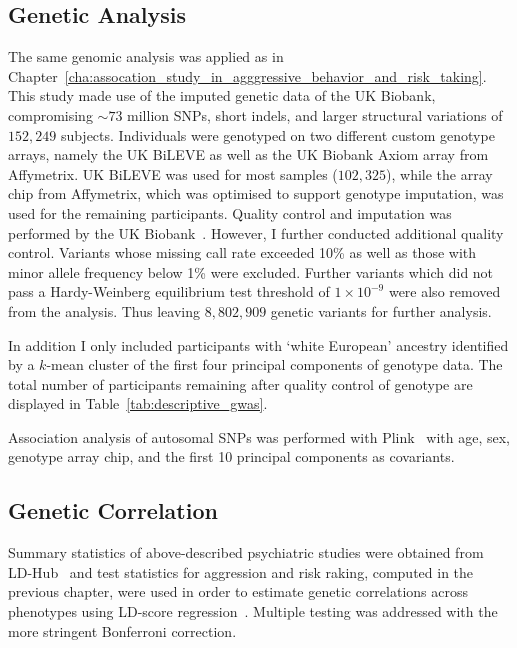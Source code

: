 \subsection{Genetic Analysis}
\label{sub:genetic_analysis}

The same genomic analysis was applied as in Chapter~\ref{cha:assocation_study_in_agggressive_behavior_and_risk_taking}.
This study made use of the imputed genetic data of the UK Biobank, compromising $\sim73$ million SNPs, short indels, and larger structural variations of $152,249$ subjects.
Individuals were genotyped on two different custom genotype arrays, namely the UK BiLEVE as well as the UK Biobank Axiom array from Affymetrix. 
UK BiLEVE was used for most samples ($102,325$), while the array chip from Affymetrix, which was optimised to support genotype imputation, was used for the remaining participants. 
Quality control and imputation was performed by the UK Biobank~\cite{Marchini2015}.
However, I further conducted additional quality control.
Variants whose missing call rate exceeded 10\% as well as those with minor allele frequency below 1\% were excluded.
Further variants which did not pass a Hardy-Weinberg equilibrium test threshold of $1\times10^{-9}$ were also removed from the analysis.
Thus leaving $8,802,909$ genetic variants for further analysis.

In addition I only included participants with `white European' ancestry identified by a $k$-mean cluster of the first four principal components of genotype data.
The total number of participants remaining after quality control of genotype are displayed in Table~\ref{tab:descriptive_gwas}.

Association analysis of autosomal SNPs was performed with Plink~\cite{Purcell2007,Chang2015} with age, sex, genotype array chip, and the first 10 principal components as covariants.

\subsection{Genetic Correlation}
\label{sub:genetic_correlation}

Summary statistics of above-described psychiatric studies were obtained from LD-Hub~\cite{ZHENG2016} and test statistics for aggression and risk raking, computed in the previous chapter, were used in order to estimate genetic correlations across phenotypes using LD-score regression~\cite{Bulik-Sullivan2015a}.
Multiple testing was addressed with the more stringent Bonferroni correction.

